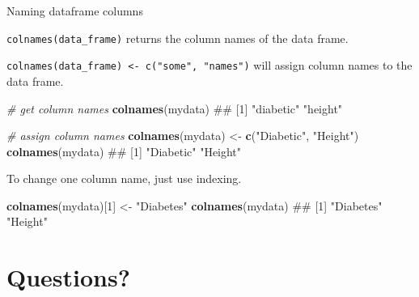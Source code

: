 \documentclass[ignorenonframetext,]{beamer}
\newenvironment{Shaded}{\begin{snugshade}}{\end{snugshade}}
\newcommand{\KeywordTok}[1]{\textcolor[rgb]{0.13,0.29,0.53}{\textbf{#1}}}
\newcommand{\DecValTok}[1]{\textcolor[rgb]{0.00,0.00,0.81}{#1}}
\newcommand{\StringTok}[1]{\textcolor[rgb]{0.31,0.60,0.02}{#1}}
\newcommand{\CommentTok}[1]{\textcolor[rgb]{0.56,0.35,0.01}{\textit{#1}}}
\newcommand{\NormalTok}[1]{#1}
\begin{document}
\begin{frame}[fragile]{Naming dataframe columns}

\texttt{colnames(data\_frame)} returns the column names of the data
frame.

\texttt{colnames(data\_frame)\ \textless{}-\ c("some",\ "names")} will
assign column names to the data frame.

\begin{Shaded}
\begin{Highlighting}[]
\CommentTok{# get column names}
\KeywordTok{colnames}\NormalTok{(mydata)}
\NormalTok{## [1] "diabetic" "height"}
\end{Highlighting}
\end{Shaded}

\begin{Shaded}
\begin{Highlighting}[]
\CommentTok{# assign column names}
\KeywordTok{colnames}\NormalTok{(mydata) <-}\StringTok{ }\KeywordTok{c}\NormalTok{(}\StringTok{"Diabetic"}\NormalTok{, }\StringTok{"Height"}\NormalTok{)}
\KeywordTok{colnames}\NormalTok{(mydata)}
\NormalTok{## [1] "Diabetic" "Height"}
\end{Highlighting}
\end{Shaded}

\end{frame}

\begin{frame}[fragile]

To change one column name, just use indexing.

\begin{Shaded}
\begin{Highlighting}[]
\KeywordTok{colnames}\NormalTok{(mydata)[}\DecValTok{1}\NormalTok{] <-}\StringTok{ "Diabetes"}
\KeywordTok{colnames}\NormalTok{(mydata)}
\NormalTok{## [1] "Diabetes" "Height"}
\end{Highlighting}
\end{Shaded}

\end{frame}

\section{Questions?}\label{questions}
\end{document}

